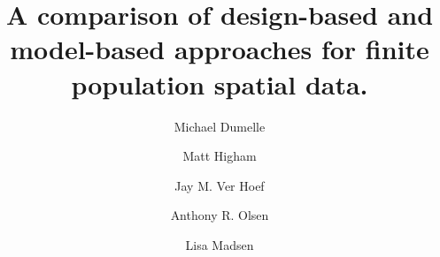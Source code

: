 \documentclass[]{elsarticle} %
\begin{document}
\begin{frontmatter}

  \title{A comparison of design-based and model-based approaches for finite
population spatial data.}
    \author[USEPA]{Michael Dumelle}
  
    \author[STLAW]{Matt Higham}
  
    \author[NOAA]{Jay M. Ver Hoef}
  
    \author[USEPA]{Anthony R. Olsen}
  
    \author[OSU]{Lisa Madsen}
  
      \address[USEPA]{United States Environmental Protection Agency, 200 SW 35th St,
Corvallis, Oregon, 97333}
    \address[STLAW]{Saint Lawrence University Department of Mathematics, Computer Science,
and Statistics, 23 Romoda Drive, Canton, New York, 13617}
    \address[NOAA]{Marine Mammal Laboratory, Alaska Fisheries Science Center, National
Oceanic and Atmospheric Administration, Seattle, Washington, 98115}
    \address[OSU]{Oregon State University Department of Statistics, 239 Weniger Hall,
Corvallis, Oregon, 97331}
  

\end{frontmatter}
\end{document}
